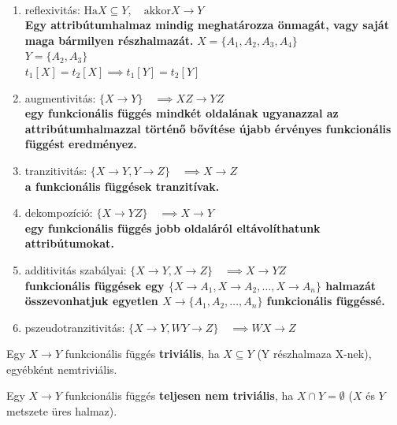 \begin{theorem}~\\
	\begin{enumerate}[nosep]
		\item reflexivitás: $\text{Ha} X\subseteq Y,\quad \text{akkor} X \to Y$\\
			{\small\bfseries Egy attribútumhalmaz mindig meghatározza önmagát, vagy saját maga bármilyen részhalmazát.}
			{\footnotesize $X = \{A_1,A_2,A_3,A_4\}$\\
			$Y = \{A_2,A_3\}$\\
			$t_1[X] = t_2[X] \implies t_1[Y]=t_2[Y]$}
		\item augmentivitás: $\{X\to Y\}\quad \implies XZ \to YZ $\\
			{\small\bfseries egy funkcionális függés mindkét oldalának ugyanazzal az attribútumhalmazzal történő bővítése újabb érvényes funkcionális függést eredményez.}
			
		\item tranzitivitás: $\{X \to Y,Y \to Z\}\quad \implies X \to Z$\\
			{\small\bfseries a funkcionális függések tranzitívak.}
		\item dekompozíció: $\{X \to YZ\}\quad \implies X \to Y$\\
			{\small\bfseries egy funkcionális függés jobb oldaláról eltávolíthatunk attribútumokat.}
		\item additivitás szabályai: $\{X \to Y,X \to Z\}\quad \implies X \to YZ$\\
			{\small\bfseries funkcionális függések egy $\{X \to A_1 ,X \to A_2 ,\dots,X \to A_n \}$ halmazát összevonhatjuk egyetlen $X \to \{A_1 ,A_2 ,\dots,A_n \}$ funkcionális függéssé.}
		\item pszeudotranzitivitás: $\{X \to Y,WY \to Z\}\quad \implies WX \to Z$\\
	\end{enumerate}
\end{theorem}
\begin{definition}
	Egy $X \to Y$ funkcionális függés \textbf{triviális}, ha $X \subseteq Y$ (Y részhalmaza X-nek), egyébként nemtriviális.
\end{definition}
\begin{theorem}
	Egy $X \to Y$ funkcionális függés \textbf{teljesen nem triviális}, ha $X\cap Y=\emptyset$ ($X$ és $Y$ metszete üres halmaz).
\end{theorem}

